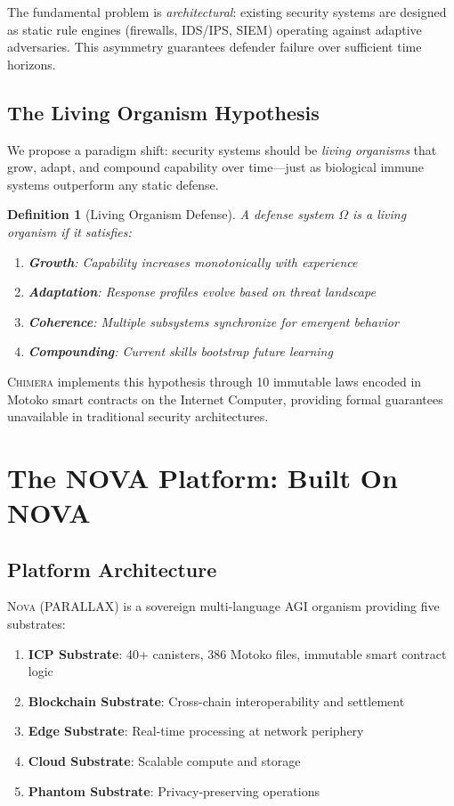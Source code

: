 \documentclass[12pt]{article}
\newtheorem{definition}[theorem]{Definition}
\newcommand{\CHIMERA}{\textsc{Chimera}}
\newcommand{\NOVA}{\textsc{Nova}}
\begin{document}
The fundamental problem is \emph{architectural}: existing security systems are designed as static rule engines (firewalls, IDS/IPS, SIEM) operating against adaptive adversaries. This asymmetry guarantees defender failure over sufficient time horizons.

\subsection{The Living Organism Hypothesis}

We propose a paradigm shift: security systems should be \emph{living organisms} that grow, adapt, and compound capability over time—just as biological immune systems outperform any static defense.

\begin{definition}[Living Organism Defense]
A defense system $\Omega$ is a \emph{living organism} if it satisfies:
\begin{enumerate}[nosep]
  \item \textbf{Growth}: Capability increases monotonically with experience
  \item \textbf{Adaptation}: Response profiles evolve based on threat landscape
  \item \textbf{Coherence}: Multiple subsystems synchronize for emergent behavior
  \item \textbf{Compounding}: Current skills bootstrap future learning
\end{enumerate}
\end{definition}

\CHIMERA{} implements this hypothesis through 10 immutable laws encoded in Motoko smart contracts on the Internet Computer, providing formal guarantees unavailable in traditional security architectures.

\section{The NOVA Platform: Built On NOVA}
\label{sec:nova}

\subsection{Platform Architecture}

\NOVA{} (PARALLAX) is a sovereign multi-language AGI organism providing five substrates:
\begin{enumerate}[nosep]
  \item \textbf{ICP Substrate}: 40+ canisters, 386 Motoko files, immutable smart contract logic
  \item \textbf{Blockchain Substrate}: Cross-chain interoperability and settlement
  \item \textbf{Edge Substrate}: Real-time processing at network periphery
  \item \textbf{Cloud Substrate}: Scalable compute and storage
  \item \textbf{Phantom Substrate}: Privacy-preserving operations
\end{enumerate}
\end{document}
